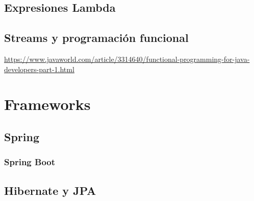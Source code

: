 \documentclass[11pt]{article}
\begin{document}
\subsection{Expresiones Lambda}
\label{sec:org0142f72}
\subsection{Streams y programación funcional}
\label{sec:org1549d8d}
\url{https://www.javaworld.com/article/3314640/functional-programming-for-java-developers-part-1.html}
\section{Frameworks}
\label{sec:org16b7876}
\subsection{Spring}
\label{sec:org024517a}
\subsubsection{Spring Boot}
\label{sec:orgda14a7b}
\subsection{Hibernate y JPA}
\label{sec:org2742f2f}
\end{document}
